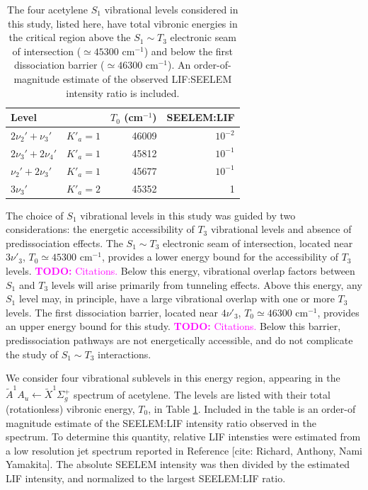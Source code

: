 \documentclass[12pt]{mitthesis}
\newcommand{\TODO} [1]{\textcolor{magenta}{\textbf{TODO:} #1}}
\newcommand{\rcm}{cm$^{-1}$}
\begin{document}
\begin{table}[t]
  \caption{The four acetylene $S_1$ vibrational levels considered in
    this study, listed here, have total vibronic energies in the
    critical region above the $S_1 \sim T_3$ electronic seam of
    intersection ($\simeq 45300$ \rcm) and below the first
    dissociation barrier ($\simeq 46300$ \rcm).  An order-of-magnitude
    estimate of the observed LIF:SEELEM intensity ratio is included.}
  \label{table:termvals}

  \centering
  \begin{tabular}{llrr}
    \\
    Level & & $T_0$ (\rcm ) & SEELEM:LIF\\
    \midrule
    $2\nu_2' +  \nu_3'$ & $K'_a\!=\!1$ & 46009 & $10^{-2}$ \\
    $2\nu_3' + 2\nu_4'$ & $K'_a\!=\!1$ & 45812 & $10^{-1}$ \\
    $ \nu_2' + 2\nu_3'$ & $K'_a\!=\!1$ & 45677 & $10^{-1}$ \\
    $3\nu_3'          $ & $K'_a\!=\!2$ & 45352 & 1 \\
  \end{tabular}
\end{table}



The choice of $S_1$ vibrational levels in this study was guided by two
considerations: the energetic accessibility of $T_3$ vibrational
levels and absence of predissociation effects.  The $S_1 \sim T_3$
electronic seam of intersection, located near $3\nu'_3$, $T_0 \simeq
45300$ \rcm, provides a lower energy bound for the accessibility of
$T_3$ levels.  \TODO{Citations.}  Below this energy, vibrational
overlap factors between $S_1$ and $T_3$ levels will arise primarily
from tunneling effects.  Above this energy, any $S_1$ level may, in
principle, have a large vibrational overlap with one or more $T_3$
levels.  The first dissociation barrier, located near $4\nu'_3$, $T_0
\simeq 46300$ \rcm, provides an upper energy bound for this study.
\TODO{Citations.}  Below this barrier, predissociation pathways are
not energetically accessible, and do not complicate the study of $S_1
\sim T_3$ interactions.

We consider four vibrational sublevels in this energy region,
appearing in the $\tilde{A}^1A_u \leftarrow \tilde{X} ^1\Sigma_g^+$
spectrum of acetylene.  The levels are listed with their total
(rotationless) vibronic energy, $T_0$, in Table \ref{table:termvals}.
Included in the table is an order-of magnitude estimate of the
SEELEM:LIF intensity ratio observed in the spectrum.  To determine
this quantity, relative LIF intensties were estimated from a low
resolution jet spectrum reported in Reference [cite: Richard, Anthony,
Nami Yamakita].  The absolute SEELEM intensity was then divided by the
estimated LIF intensity, and normalized to the largest SEELEM:LIF
ratio.
\end{document}
